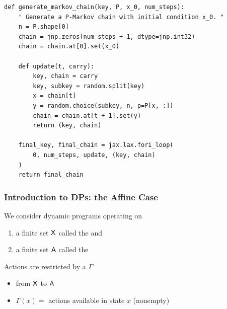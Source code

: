 \documentclass[dvipsnames]{beamer}
\begin{document}
\begin{frame}[fragile]

    {\small
    
    \begin{verbatim}
def generate_markov_chain(key, P, x_0, num_steps):
    " Generate a P-Markov chain with initial condition x_0. "
    n = P.shape[0]
    chain = jnp.zeros(num_steps + 1, dtype=jnp.int32)
    chain = chain.at[0].set(x_0)
    
    def update(t, carry):
        key, chain = carry
        key, subkey = random.split(key)
        x = chain[t]
        y = random.choice(subkey, n, p=P[x, :])
        chain = chain.at[t + 1].set(y)
        return (key, chain)
    
    final_key, final_chain = jax.lax.fori_loop(
        0, num_steps, update, (key, chain)
    )
    return final_chain
\end{verbatim}

}

\end{frame}


\begin{frame}\frametitle{Introduction to DPs: the Affine Case}

    We consider dynamic programs operating on 
    \begin{enumerate}
        \item a finite set $\mathsf X$ called the  and
        \vspace{0.5em}
        \item a finite set $\mathsf A$ called the 
    \end{enumerate}
     
    \vspace{0.5em}
        \vspace{0.5em}
        \vspace{0.5em}

    Actions are restricted by a  $\Gamma$

    \begin{itemize}
        \vspace{0.5em}
        \item from $\mathsf X$ to $\mathsf A$
        \vspace{0.5em}
        \item $\Gamma(x) =$ actions available in state $x$  (nonempty)
    \end{itemize}

\end{frame}
\end{document}
